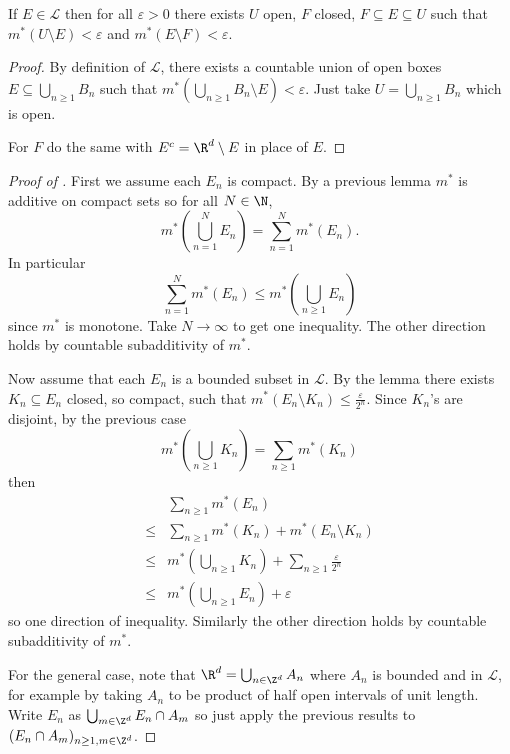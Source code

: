 \documentclass[a4paper]{article}
\begin{document}
\begin{lemma}
  If \(E \in \mathcal L\) then for all \(\varepsilon > 0\) there exists \(U\) open, \(F\) closed, \(F \subseteq E \subseteq U\) such that \(m^*(U \setminus E) < \varepsilon\) and \(m^*(E \setminus F) < \varepsilon\).
\end{lemma}

\begin{proof}
  By definition of \(\mathcal L\), there exists a countable union of open boxes \(E \subseteq \bigcup_{n \geq 1} B_n\) such that \(m^*(\bigcup_{n \geq 1} B_n \setminus E) < \varepsilon\). Just take \(U = \bigcup_{n \geq 1} B_n\) which is open.

  For \(F\) do the same with \(E^c = \R^d \setminus E\) in place of \(E\).
\end{proof}

\begin{proof}[Proof of ]
  First we assume each \(E_n\) is compact. By a previous lemma \(m^*\) is additive on compact sets so for all \(N \in \N\),
  \[
    m^*(\bigcup_{n = 1}^N E_n) = \sum_{n = 1}^N m^*(E_n).
  \]
  In particular
  \[
    \sum_{n = 1}^N m^*(E_n) \leq m^*(\bigcup_{n \geq 1} E_n)
  \]
  since \(m^*\) is monotone. Take \(N \to \infty\) to get one inequality. The other direction holds by countable subadditivity of \(m^*\).

  Now assume that each \(E_n\) is a bounded subset in \(\mathcal L\). By the lemma there exists \(K_n \subseteq E_n\) closed, so compact, such that \(m^*(E_n \setminus K_n) \leq \frac{\varepsilon}{2^n}\). Since \(K_n\)'s are disjoint, by the previous case
  \[
    m^*(\bigcup_{n \geq 1} K_n) = \sum_{n \geq 1} m^*(K_n)
  \]
  then
  \begin{align*}
    &\sum_{n \geq 1} m^*(E_n) \\
    \leq& \sum_{n \geq 1} m^*(K_n) + m^*(E_n \setminus K_n) \\
    \leq& m^*(\bigcup_{n \geq 1} K_n) + \sum_{n \geq 1} \frac{\varepsilon}{2^n} \\
    \leq& m^*(\bigcup_{n \geq 1} E_n) + \varepsilon
  \end{align*}
  so one direction of inequality. Similarly the other direction holds by countable subadditivity of \(m^*\).

  For the general case, note that \(\R^d = \bigcup_{n \in \Z^d} A_n\) where \(A_n\) is bounded and in \(\mathcal L\), for example by taking \(A_n\) to be product of half open intervals of unit length. Write \(E_n\) as \(\bigcup_{m \in \Z^d} E_n \cap A_m\) so just apply the previous results to \((E_n \cap A_m)_{n\geq 1, m \in \Z^d}\).
\end{proof}
\end{document}
